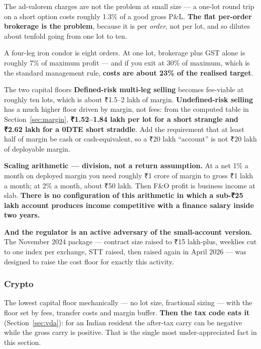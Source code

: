 \documentclass[11pt,a4paper]{article}
\newcommand{\rs}{₹}
\begin{document}
The ad-valorem charges are not the problem at small size --- a one-lot round trip
on a short option costs roughly 1.3\% of a good gross P\&L. \textbf{The flat
per-order brokerage is the problem}, because it is per \emph{order}, not per lot,
and so dilutes about tenfold going from one lot to ten.

A four-leg iron condor is eight orders. At one lot, brokerage plus GST alone is
roughly 7\% of maximum profit --- and if you exit at 30\% of maximum, which is the
standard management rule, \textbf{costs are about 23\% of the realised target}.

\begin{keyfact}{The two capital floors}
\textbf{Defined-risk multi-leg selling} becomes fee-viable at roughly ten lots,
which is about \rs 1.5--2 lakh of margin. \textbf{Undefined-risk selling} has a
much higher floor driven by margin, not fees: from the computed table in
Section~\ref{sec:margin}, \textbf{\rs 1.52--1.84 lakh per lot for a short strangle
and \rs 2.62 lakh for a 0DTE short straddle}. Add the requirement that at least
half of margin be cash or cash-equivalent, so a \rs 20 lakh ``account'' is not
\rs 20 lakh of deployable margin.
\end{keyfact}

\textbf{Scaling arithmetic --- division, not a return assumption.} At a net 1\% a
month on deployed margin you need roughly \rs 1 crore of margin to gross \rs 1 lakh
a month; at 2\% a month, about \rs 50 lakh. Then F\&O profit is business income at
slab. \textbf{There is no configuration of this arithmetic in which a sub-\rs 25
lakh account produces income competitive with a finance salary inside two years.}

\textbf{And the regulator is an active adversary of the small-account version.} The
November 2024 package --- contract size raised to \rs 15 lakh-plus, weeklies cut to
one index per exchange, STT raised, then raised again in April 2026 --- was designed
to raise the cost floor for exactly this activity.

\subsubsection{Crypto}

The lowest capital floor mechanically --- no lot size, fractional sizing --- with
the floor set by fees, transfer costs and margin buffer. \textbf{Then the tax code
eats it} (Section~\ref{sec:vda}): for an Indian resident the after-tax carry can be
negative while the gross carry is positive. That is the single most
under-appreciated fact in this section.
\end{document}
